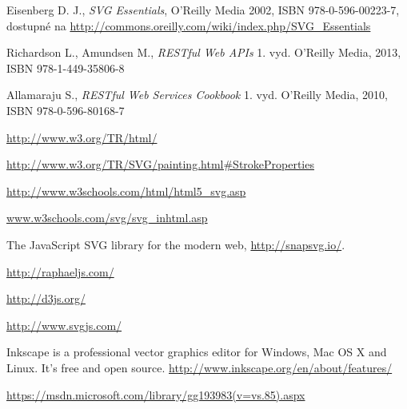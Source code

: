 \begin{thebibliography}{99}
Eisenberg D. J., {\it SVG Essentials}, 
O'Reilly Media 2002, ISBN  978-0-596-00223-7,  dostupné na \url{http://commons.oreilly.com/wiki/index.php/SVG_Essentials}

Richardson L., Amundsen M., {\it RESTful Web APIs} 
1. vyd. O'Reilly Media, 2013, 
ISBN 978-1-449-35806-8

Allamaraju S., {\it RESTful Web Services Cookbook} 
1. vyd. O'Reilly Media, 2010, 
ISBN 978-0-596-80168-7





\url{http://www.w3.org/TR/html/}

\url{http://www.w3.org/TR/SVG/painting.html#StrokeProperties}

\url{ http://www.w3schools.com/html/html5_svg.asp}

\url{www.w3schools.com/svg/svg_inhtml.asp}


The JavaScript SVG library for the modern web,
\url{http://snapsvg.io/}.


\url{ http://raphaeljs.com/}

\url {http://d3js.org/}

 
 \url{http://www.svgjs.com/}


Inkscape is a professional vector graphics editor for Windows, Mac OS X and Linux. It's free and open source.
\url {http://www.inkscape.org/en/about/features/}


\url{https://msdn.microsoft.com/library/gg193983(v=vs.85).aspx}

\end{thebibliography}